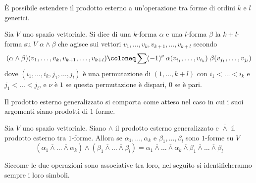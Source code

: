 È possibile estendere il prodotto esterno a un'operazione tra forme di ordini $k$ e $l$ generici.
\begin{definition}
  Sia $V$ uno spazio vettoriale. Si dice  di una $k$-forma $\alpha$ e una $l$-forma $\beta$ la $k+l$-forma su $V$ $\alpha \wedge \beta$ che agisce sui vettori $v_1, \ldots, v_k, v_{k+1}, \ldots, v_{k+l}$ secondo
\begin{equation}
(\alpha \wedge \beta) (v_1, \ldots, v_k, v_{k+1}, \ldots, v_{k+l}) \defeq \sum (-1)^{\nu}\, \alpha(v_{i_1}, \ldots, v_{i_k})\; \beta(v_{j_1}, \ldots, v_{j_l})
\end{equation} 
dove $(i_1, \ldots, i_k, j_1, \ldots, j_l)$ è una permutazione di $(1, \ldots, k+l)$ con $i_1 < \ldots < i_k$ e $j_1 < \ldots < j_l$, e $\nu$ è $1$ se questa permutazione è dispari, $0$ se è pari.
\end{definition}

Il prodotto esterno generalizzato si comporta come atteso nel caso in cui i suoi argomenti siano prodotti di $1$-forme.
\begin{theorem}
  Sia $V$ uno spazio vettoriale. Siano $\wedge$ il prodotto esterno generalizzato e $\overline{\wedge}$ il prodotto esterno tra $1$-forme. Allora se $\alpha_1, \ldots, \alpha_k$ e $\beta_1, \ldots, \beta_l$ sono $1$-forme su $V$ \begin{equation}
  (\alpha_1 \overline{\wedge} \ldots \overline{\wedge} \alpha_k) \wedge (\beta_1 \overline{\wedge} \ldots \overline{\wedge} \beta_l) = \alpha_1 \overline{\wedge} \ldots \overline{\wedge} \alpha_k \overline{\wedge} \beta_1 \overline{\wedge} \ldots \overline{\wedge} \beta_l
  \end{equation} 
\end{theorem}
\begin{remark}
  Siccome le due operazioni sono associative tra loro, nel seguito si identificheranno sempre i loro simboli.
\end{remark}

